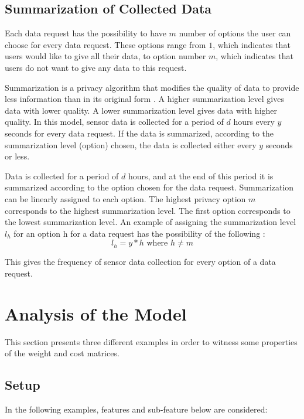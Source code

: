 \subsection{Summarization of Collected Data} \label{summa}
Each data request has the possibility to have $m$ number of options the user can choose for every data request. These options range from $1$, which indicates that users would like to give all their data, to option number $m$, which indicates that users do not want to give any data to this request.

Summarization is a privacy algorithm that modifies the quality of data to provide less information than in its original form \cite{pournaras2016self}. A higher summarization level gives data with lower quality. A lower summarization level gives data with higher quality. In this model, sensor data is collected for a period of $d$ hours every $y$ seconds for every data request. If the data is summarized, according to the summarization level (option) chosen, the data is collected either every $y$ seconds or less.

Data is collected for a period of $d$ hours, and at the end of this period it is summarized according to the option chosen for the data request. Summarization can
be linearly assigned to each option.
The highest privacy option $m$ corresponds to the highest summarization level. The first option corresponds to the lowest summarization level. An example of assigning the summarization level $l_{h}$ for an option h for a data request has the possibility of the following :
\begin{equation}
l_{h} = y*h \text{ where } h \neq m
\end{equation}

This gives the frequency of sensor data collection for every option of a data request.

\section{Analysis of the Model} \label{analysis_model}
This section presents three different examples in order to witness some properties of the weight and cost matrices.

\subsection{Setup}
In the following examples, features and sub-feature below are considered:

